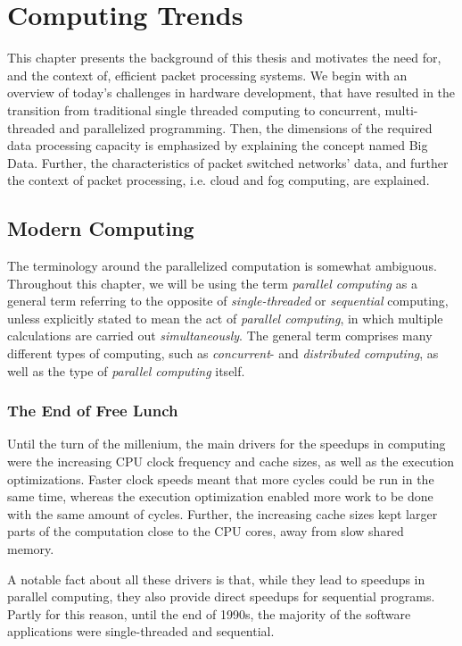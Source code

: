 \chapter{Computing Trends}
\label{chapter:computing-trends}
This chapter presents the background of this thesis and motivates the need for, and the context of, efficient packet processing systems. We begin with an overview of today's challenges in hardware development, that have resulted in the transition from traditional single threaded computing to concurrent, multi-threaded and parallelized programming. Then, the dimensions of the required data processing capacity is emphasized by explaining the concept named Big Data. Further, the characteristics of packet switched networks' data, and further the context of packet processing, i.e. cloud and fog computing, are explained.

\section{Modern Computing}
The terminology around the parallelized computation is somewhat ambiguous. Throughout this chapter, we will be using the term \emph{parallel computing} as a general term referring to the opposite of \emph{single-threaded} or \emph{sequential} computing, unless explicitly stated to mean the act of \emph{parallel computing}, in which multiple calculations are carried out \emph{simultaneously}. The general term comprises many different types of computing, such as \emph{concurrent}- and \emph{distributed computing}, as well as the type of \emph{parallel computing} itself.

\subsection{The End of Free Lunch}
\label{subsection:the-end-of-free-lunch}
Until the turn of the millenium, the main drivers for the speedups in computing were the increasing CPU clock frequency and cache sizes, as well as the execution optimizations. Faster clock speeds meant that more cycles could be run in the same time, whereas the execution optimization enabled more work to be done with the same amount of cycles. Further, the increasing cache sizes kept larger parts of the computation close to the CPU cores, away from slow shared memory.~\cite{Sutter:2005:FLiO}

A notable fact about all these drivers is that, while they lead to speedups in parallel computing, they also provide direct speedups for sequential programs. Partly for this reason, until the end of 1990s, the majority of the software applications were single-threaded and sequential.~\cite{Sutter:2005:FLiO}

